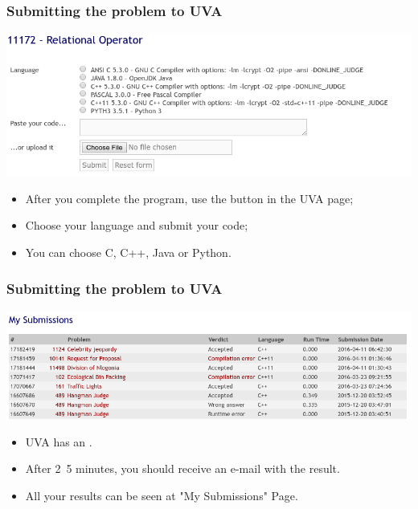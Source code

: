 \documentclass{beamer}
\begin{document}
\begin{frame}
  \frametitle{Submitting the problem to UVA}
  \begin{center}
    \includegraphics[width=1.1\textwidth]{../img/submitpage}
  \end{center}

  \begin{itemize}
    \item After you complete the program, use the  button in the UVA page;
    \item Choose your language and submit your code;
    \item You can choose C, C++, Java or Python.
  \end{itemize}
\end{frame}

\begin{frame}
  \frametitle{Submitting the problem to UVA}

    \begin{center}
      \includegraphics[width=1.1\textwidth]{../img/submissionpage}
    \end{center}

    \begin{itemize}
      \item UVA has an .
      \item After 2~5 minutes, you should receive an e-mail with the result.
      \item All your results can be seen at "My Submissions" Page.
    \end{itemize}
\end{frame}
\end{document}
